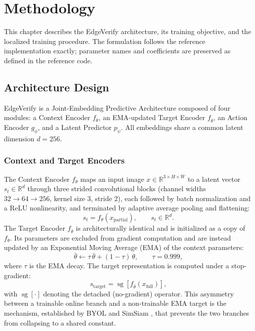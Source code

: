 \chapter{Methodology}
\label{chap:method}

This chapter describes the EdgeVerify architecture, its training objective,
and the localized training procedure. The formulation follows the
reference implementation exactly; parameter names and coefficients
are preserved as defined in the reference code.

\section{Architecture Design}
EdgeVerify is a Joint-Embedding Predictive Architecture composed of four
modules: a Context Encoder $f_\theta$, an EMA-updated Target Encoder
$f_{\bar{\theta}}$, an Action Encoder $g_\phi$, and a Latent Predictor
$p_\psi$. All embeddings share a common latent dimension $d = 256$.

\subsection{Context and Target Encoders}
The Context Encoder $f_\theta$ maps an input image
$x \in \mathbb{R}^{3 \times H \times W}$ to a latent vector
$s_t \in \mathbb{R}^{d}$ through three strided convolutional blocks
(channel widths $32 \rightarrow 64 \rightarrow 256$, kernel size $3$,
stride $2$), each followed by batch normalization and a ReLU nonlinearity,
and terminated by adaptive average pooling and flattening:
\begin{equation}
    s_t = f_\theta(x_{\text{partial}}), \qquad s_t \in \mathbb{R}^{d}.
\end{equation}
The Target Encoder $f_{\bar\theta}$ is architecturally identical and is
initialized as a copy of $f_\theta$. Its parameters are excluded from
gradient computation and are instead updated by an Exponential Moving
Average (EMA) of the context parameters:
\begin{equation}
    \bar{\theta} \leftarrow \tau\,\bar{\theta} + (1 - \tau)\,\theta,
    \qquad \tau = 0.999,
    \label{eq:ema}
\end{equation}
where $\tau$ is the EMA decay. The target representation is computed under
a stop-gradient:
\begin{equation}
    s_{\text{target}} = \operatorname{sg}\!\left[f_{\bar\theta}(x_{\text{full}})\right],
\end{equation}
with $\operatorname{sg}[\cdot]$ denoting the detached (no-gradient)
operator. This asymmetry between a trainable online branch and a
non-trainable EMA target is the mechanism, established by BYOL
\cite{grill2020bootstrap} and SimSiam \cite{chen2021exploring}, that
prevents the two branches from collapsing to a shared constant.

